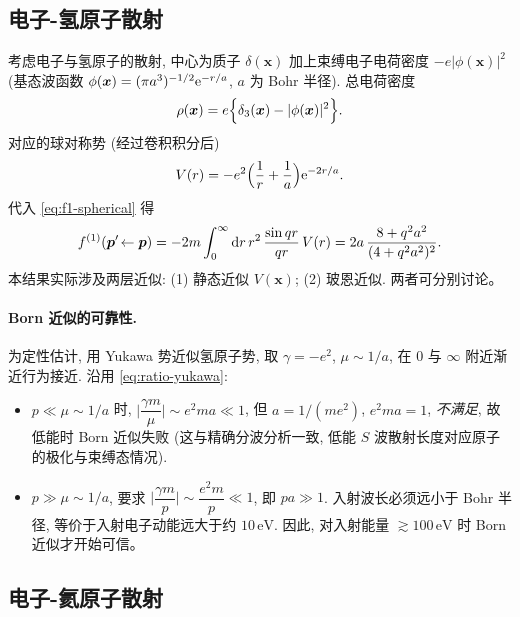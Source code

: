 \subsection{电子-氢原子散射}

考虑电子与氢原子的散射, 中心为质子 $\delta(\bm x)$ 加上束缚电子电荷密度 $-e|\phi(\bm x)|^{2}$ (基态波函数 $\phi(\bm x)=(\pi a^{3})^{-1/2}\mathrm{e}^{-r/a}$, $a$ 为 Bohr 半径). 总电荷密度
\begin{equation}
\rho(\bm x)=e\Bigl\{\delta_{3}(\bm x)-|\phi(\bm x)|^{2}\Bigr\}.
\end{equation}
对应的球对称势 (经过卷积积分后)
\begin{equation}
V(r)=-e^{2}\Bigl(\frac{1}{r}+\frac{1}{a}\Bigr)\mathrm{e}^{-2r/a}.
\end{equation}
代入 \eqref{eq:f1-spherical} 得
\begin{equation}
f^{(1)}(\bm p'\!\leftarrow\bm p)
=-2m\int_{0}^{\infty}\mathrm{d} r\,r^{2}\,\frac{\sin qr}{qr}\,V(r)
=2 a\,\frac{8+q^{2}a^{2}}{(4+q^{2}a^{2})^{2}}.
\label{eq:f1-eH}
\end{equation}
本结果实际涉及两层近似: (1) 静态近似 $V(\bm x)$; (2) 玻恩近似. 两者可分别讨论。

\paragraph{Born 近似的可靠性.}
为定性估计, 用 Yukawa 势近似氢原子势, 取 $\gamma=-e^{2}$, $\mu\sim 1/a$, 在 0 与 $\infty$ 附近渐近行为接近. 沿用 \eqref{eq:ratio-yukawa}:
\begin{itemize}
\item $p\ll\mu\sim 1/a$ 时, $\bigl|\dfrac{\gamma m}{\mu}\bigr|\sim e^{2}ma\ll 1$, 但 $a=1/(me^{2})$, $e^{2}ma=1$, \emph{不满足}, 故低能时 Born 近似失败 (这与精确分波分析一致, 低能 $S$ 波散射长度对应原子的极化与束缚态情况).
\item $p\gg\mu\sim 1/a$, 要求 $\bigl|\dfrac{\gamma m}{p}\bigr|\sim\dfrac{e^{2}m}{p}\ll 1$, 即 $pa\gg 1$. 入射波长必须远小于 Bohr 半径, 等价于入射电子动能远大于约 $10\,\mathrm{eV}$. 因此, 对入射能量 $\gtrsim 100\,\mathrm{eV}$ 时 Born 近似才开始可信。
\end{itemize}

\subsection{电子-氦原子散射}

